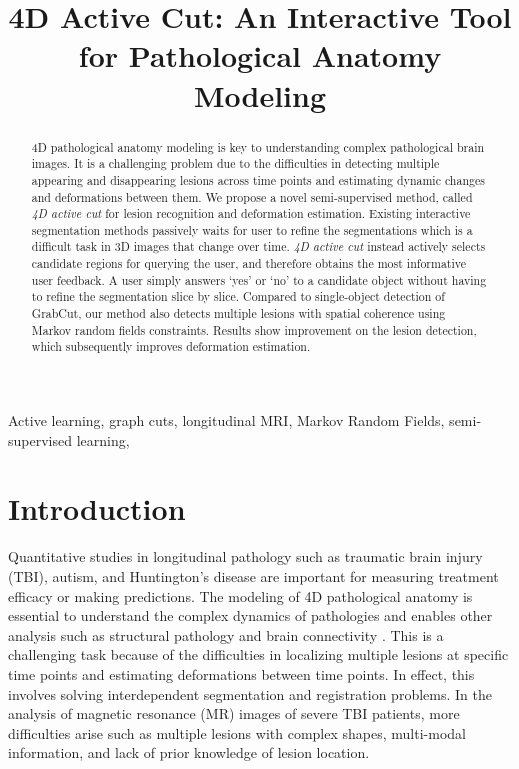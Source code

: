 \documentclass{article}
\title{4D Active Cut: An Interactive Tool for Pathological Anatomy Modeling}
\begin{document}
%
\maketitle
%
\begin{abstract}
4D pathological anatomy modeling is key to understanding complex
pathological brain images. It is a challenging problem due to the difficulties
in detecting multiple appearing and disappearing lesions across time points and estimating
dynamic changes and deformations between them.
We propose a novel semi-supervised method, called \emph{4D active cut}
for lesion recognition and deformation estimation. Existing
interactive segmentation methods passively waits for user to refine the
segmentations which is a difficult task in 3D images that change over time.
\emph{4D active cut} instead
actively selects candidate regions for querying the user, and therefore
obtains the most informative user feedback. A user simply answers `yes' or `no' to
a candidate object without having to refine the segmentation slice by
slice. Compared to single-object detection of GrabCut, our method also
detects multiple lesions with spatial coherence using Markov random
fields constraints. Results show improvement on the lesion detection, which
subsequently improves deformation estimation.
\end{abstract}
%
\begin{keywords}
Active learning, graph cuts, longitudinal MRI, Markov Random Fields,
semi-supervised learning, \end{keywords}
%

\section{Introduction}
\label{sec:intro}

Quantitative studies in longitudinal pathology such as traumatic brain injury
(TBI), autism, and Huntington's disease are important for
measuring treatment efficacy or making predictions. The
modeling of 4D pathological anatomy is essential to understand the complex
dynamics of pathologies and enables other analysis such as structural pathology and
brain connectivity \cite{Irimia2012}. This is a challenging task because of the
difficulties in localizing multiple lesions at specific time points and
estimating deformations between time points. In effect, this involves
solving interdependent segmentation and registration problems.
In the analysis of magnetic resonance (MR) images of severe TBI patients,
more difficulties arise such as multiple lesions with complex shapes,
multi-modal information, and lack of prior knowledge of lesion
location.
\end{document}
